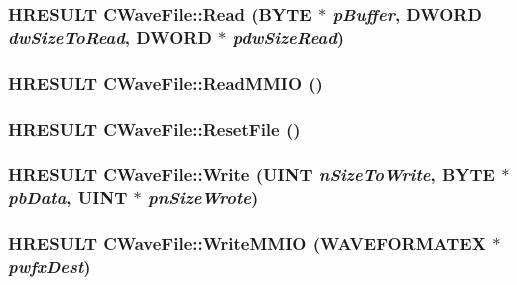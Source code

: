\label{class_c_wave_file_abf4405c91380ebd3377f1368b45d7cbb}
\hypertarget{class_c_wave_file_a1eb28886c3d56d2ff278de51803cfe64}{
\subsubsection[{Read}]{\setlength{\rightskip}{0pt plus 5cm}HRESULT CWaveFile::Read (BYTE $\ast$ {\em pBuffer}, \/  DWORD {\em dwSizeToRead}, \/  DWORD $\ast$ {\em pdwSizeRead})}}
\label{class_c_wave_file_a1eb28886c3d56d2ff278de51803cfe64}
\hypertarget{class_c_wave_file_af5607e7ba6d1502735dc5bfa0da8d2b9}{
\subsubsection[{ReadMMIO}]{\setlength{\rightskip}{0pt plus 5cm}HRESULT CWaveFile::ReadMMIO ()}}
\label{class_c_wave_file_af5607e7ba6d1502735dc5bfa0da8d2b9}
\hypertarget{class_c_wave_file_ae6791a066f89f5e147cc0f5d9f2dbdbc}{
\subsubsection[{ResetFile}]{\setlength{\rightskip}{0pt plus 5cm}HRESULT CWaveFile::ResetFile ()}}
\label{class_c_wave_file_ae6791a066f89f5e147cc0f5d9f2dbdbc}
\hypertarget{class_c_wave_file_a7c82ff281e7c3378b5a8f08c3561e537}{
\subsubsection[{Write}]{\setlength{\rightskip}{0pt plus 5cm}HRESULT CWaveFile::Write (UINT {\em nSizeToWrite}, \/  BYTE $\ast$ {\em pbData}, \/  UINT $\ast$ {\em pnSizeWrote})}}
\label{class_c_wave_file_a7c82ff281e7c3378b5a8f08c3561e537}
\hypertarget{class_c_wave_file_aa3524cf0271959bb3f190a58b5669002}{
\subsubsection[{WriteMMIO}]{\setlength{\rightskip}{0pt plus 5cm}HRESULT CWaveFile::WriteMMIO (WAVEFORMATEX $\ast$ {\em pwfxDest})}}
\label{class_c_wave_file_aa3524cf0271959bb3f190a58b5669002}


